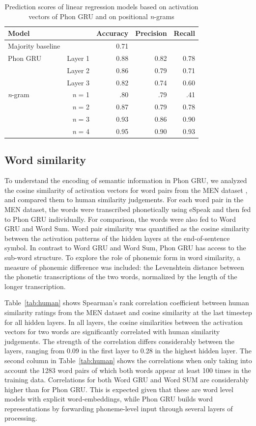 \begin{table}[]
	\centering
	\begin{tabular}{lrrrr}
		\textbf{Model} & & \textbf{Accuracy} & \textbf{Precision} & \textbf{Recall} \\
		\hline
		Majority baseline & & 0.71 & & \\
		\hline
		Phon GRU & Layer 1 & 0.88 & 0.82 & 0.78 \\
		& Layer 2 & 0.86 & 0.79 & 0.71 \\
		& Layer 3 &  0.82 & 0.74 & 0.60 \\
		\hline
		\textit{n}-gram & \textit{n} = 1 & .80 & .79 & .41 \\
		& \textit{n} = 2 & 0.87 & 0.79 & 0.78 \\
		& \textit{n} = 3 & 0.93 & 0.86 & 0.90 \\
		& \textit{n} = 4 & 0.95 & 0.90 & 0.93
	\end{tabular}
	\caption{Prediction scores of linear regression models based on activation vectors of {\sc Phon GRU} and on positional \textit{n}-grams}
\label{tab:boundary}
\end{table}

\subsection{Word similarity}
To understand the encoding of semantic information in {\sc Phon GRU}, we analyzed the cosine similarity of activation vectors for word pairs from the MEN dataset \cite{bruni2014multimodal}, and compared them to human similarity judgements.
For each word pair in the MEN dataset, the words were transcribed phonetically using eSpeak and then fed to {\sc Phon GRU} individually. For comparison, the words were also fed to {\sc Word GRU} and {\sc Word Sum}. Word pair similarity was quantified as the cosine similarity between the activation patterns of the hidden layers at the end-of-sentence symbol.
In contrast to {\sc Word GRU} and {\sc Word Sum}, {\sc Phon GRU} has access to the sub-word structure. To explore the role of phonemic form in word similarity, a measure of phonemic difference was included: the Levenshtein distance between the phonetic transcriptions of the two words, normalized by  the length of the longer transcription. 

Table~\ref{tab:human} shows Spearman's rank correlation coefficient between human similarity ratings from the MEN dataset and cosine similarity at the last timestep for all hidden layers. In all layers, the cosine similarities between the activation vectors for two words are significantly correlated with human similarity judgements. The strength of the correlation differs considerably between the layers, ranging from 0.09 in the first layer to 0.28 in the highest hidden layer. The second column in Table~\ref{tab:human} shows the correlations when only taking into account the 1283 word pairs of which both words appear at least 100 times in the training data. 
Correlations for both {\sc Word GRU} and {\sc Word SUM} are considerably higher than for {\sc Phon GRU}. This is expected given that these are word level models with explicit word-embeddings, while {\sc Phon GRU} builds word representations by forwarding phoneme-level input through several layers of processing.


